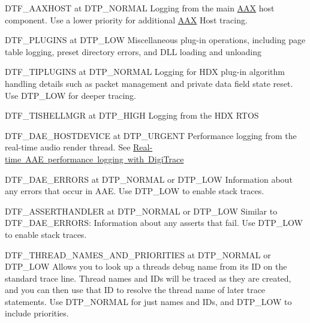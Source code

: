 \begin{DoxyItemize}
\item {\ttfamily D\+T\+F\+\_\+\+A\+A\+X\+H\+O\+ST} at {\ttfamily D\+T\+P\+\_\+\+N\+O\+R\+M\+AL} Logging from the main \mbox{\hyperlink{a00852}{A\+AX}} host component. Use a lower priority for additional \mbox{\hyperlink{a00852}{A\+AX}} Host tracing.  
\item {\ttfamily D\+T\+F\+\_\+\+P\+L\+U\+G\+I\+NS} at {\ttfamily D\+T\+P\+\_\+\+L\+OW} Miscellaneous plug-\/in operations, including page table logging, preset directory errors, and D\+LL loading and unloading  
\item {\ttfamily D\+T\+F\+\_\+\+T\+I\+P\+L\+U\+G\+I\+NS} at {\ttfamily D\+T\+P\+\_\+\+N\+O\+R\+M\+AL} Logging for H\+DX plug-\/in algorithm handling details such as packet management and private data field state reset. Use {\ttfamily D\+T\+P\+\_\+\+L\+OW} for deeper tracing.  
\item {\ttfamily D\+T\+F\+\_\+\+T\+I\+S\+H\+E\+L\+L\+M\+GR} at {\ttfamily D\+T\+P\+\_\+\+H\+I\+GH} Logging from the H\+DX R\+T\+OS  
\item {\ttfamily D\+T\+F\+\_\+\+D\+A\+E\+\_\+\+H\+O\+S\+T\+D\+E\+V\+I\+CE} at {\ttfamily D\+T\+P\+\_\+\+U\+R\+G\+E\+NT} Performance logging from the real-\/time audio render thread. See \mbox{\hyperlink{a00834_digitrace__performancelogging}{Real-\/time A\+AE performance logging with Digi\+Trace}}  
\item {\ttfamily D\+T\+F\+\_\+\+D\+A\+E\+\_\+\+E\+R\+R\+O\+RS} at {\ttfamily D\+T\+P\+\_\+\+N\+O\+R\+M\+AL} or {\ttfamily D\+T\+P\+\_\+\+L\+OW} Information about any errors that occur in A\+AE. Use {\ttfamily D\+T\+P\+\_\+\+L\+OW} to enable stack traces.   
\item {\ttfamily D\+T\+F\+\_\+\+A\+S\+S\+E\+R\+T\+H\+A\+N\+D\+L\+ER} at {\ttfamily D\+T\+P\+\_\+\+N\+O\+R\+M\+AL} or {\ttfamily D\+T\+P\+\_\+\+L\+OW} Similar to {\ttfamily D\+T\+F\+\_\+\+D\+A\+E\+\_\+\+E\+R\+R\+O\+RS}\+: Information about any asserts that fail. Use {\ttfamily D\+T\+P\+\_\+\+L\+OW} to enable stack traces.   
\item {\ttfamily D\+T\+F\+\_\+\+T\+H\+R\+E\+A\+D\+\_\+\+N\+A\+M\+E\+S\+\_\+\+A\+N\+D\+\_\+\+P\+R\+I\+O\+R\+I\+T\+I\+ES} at {\ttfamily D\+T\+P\+\_\+\+N\+O\+R\+M\+AL} or {\ttfamily D\+T\+P\+\_\+\+L\+OW} Allows you to look up a thread\textquotesingle{}s debug name from its ID on the standard trace line. Thread names and I\+Ds will be traced as they are created, and you can then use that ID to resolve the thread name of later trace statements. Use {\ttfamily D\+T\+P\+\_\+\+N\+O\+R\+M\+AL} for just names and I\+Ds, and {\ttfamily D\+T\+P\+\_\+\+L\+OW} to include priorities.   

\end{DoxyItemize}
